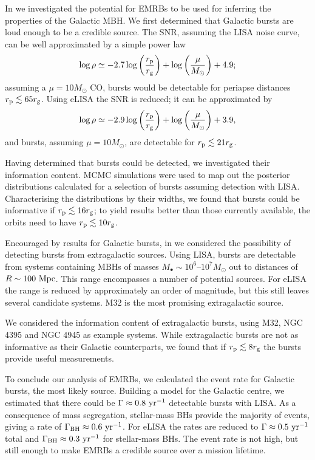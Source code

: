 In  we investigated the potential for EMRBs to be used for inferring the properties of the Galactic MBH. We first determined that Galactic bursts are loud enough to be a credible source. The SNR, assuming the LISA noise curve, can be well approximated by a simple power law
\begin{equation}
\log\rho \simeq -2.7\log\left(\dfrac{r_\mathrm{p}}{r_\mathrm{g}}\right) + \log\left(\dfrac{\mu}{M_\odot}\right) + 4.9;
\end{equation}
assuming a $\mu = 10 M_\odot$ CO, bursts would be detectable for periapse distances $r_\mathrm{p} \lesssim 65 r_\mathrm{g}$. Using eLISA the SNR is reduced; it can be approximated by 
\begin{equation}
\log\rho \simeq -2.9\log\left(\dfrac{r_\mathrm{p}}{r_\mathrm{g}}\right) + \log\left(\dfrac{\mu}{M_\odot}\right) + 3.9,
\end{equation}
and bursts, assuming $\mu = 10 M_\odot$, are detectable for $r_\mathrm{p} \lesssim 21 r_\mathrm{g}$.

Having determined that bursts could be detected, we investigated their information content. MCMC simulations were used to map out the posterior distributions calculated for a selection of bursts assuming detection with LISA. Characterising the distributions by their widths, we found that bursts could be informative if $r_\mathrm{p} \lesssim 16 r_\mathrm{g}$; to yield results better than those currently available, the orbits need to have $r_\mathrm{p} \lesssim 10 r_\mathrm{g}$.

Encouraged by results for Galactic bursts, in  we considered the possibility of detecting bursts from extragalactic sources. Using LISA, bursts are detectable from systems containing MBHs of masses $M_\bullet \sim 10^6$--$10^7 M_\odot$ out to distances of $R \sim 100~\mathrm{Mpc}$. This range encompasses a number of potential sources. For eLISA the range is reduced by approximately an order of magnitude, but this still leaves several candidate systems. M32 is the most promising extragalactic source.

We considered the information content of extragalactic bursts, using M32, NGC 4395 and NGC 4945 as example systems. While extragalactic bursts are not as informative as their Galactic counterparts, we found that if $r_\mathrm{p} \lesssim 8 r_\mathrm{g}$ the bursts provide useful measurements.

To conclude our analysis of EMRBs, we calculated the event rate for Galactic bursts, the most likely source. Building a model for the Galactic centre, we estimated that there could be $\Gamma \approx 0.8~\mathrm{yr^{-1}}$ detectable bursts with LISA. As a consequence of mass segregation, stellar-mass BHs provide the majority of events, giving a rate of $\Gamma_\mathrm{BH} \approx 0.6~\mathrm{yr^{-1}}$. For eLISA the rates are reduced to $\Gamma \approx 0.5~\mathrm{yr^{-1}}$ total and $\Gamma_\mathrm{BH} \approx 0.3~\mathrm{yr^{-1}}$ for stellar-mass BHs. The event rate is not high, but still enough to make EMRBs a credible source over a mission lifetime.

